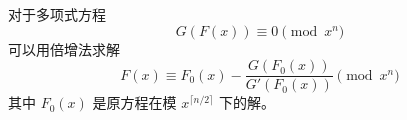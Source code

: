对于多项式方程
$$
G(F(x)) \equiv 0 \pmod{x^n}
$$
可以用倍增法求解
$$
F(x) \equiv F_0 (x) - \frac{G(F_0 (x))}{G' (F_0 (x)) }  \pmod{x^n}
$$
其中 $F_0 (x)$ 是原方程在模 $x^{ \lceil n/2 \rceil }$ 下的解。
